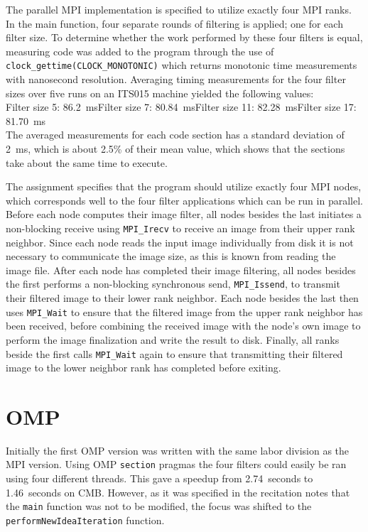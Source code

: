 The parallel MPI implementation is specified to utilize exactly four MPI ranks. In the main function, four separate rounds of filtering is applied; one for each filter size. To determine whether the work performed by these four filters is equal, measuring code was added to the program through the use of \texttt{clock\_gettime(CLOCK\_MONOTONIC)} which returns monotonic time measurements with nanosecond resolution. Averaging timing measurements for the four filter sizes over five runs on an \textsc{ITS015} machine yielded the following values:\\[0.2cm]
Filter size 5: 86.2~ms\quad Filter size 7: 80.84~ms\quad Filter size 11: 82.28~ms\quad Filter size 17: 81.70~ms\\[0.2cm]
The averaged measurements for each code section has a standard deviation of 2~ms, which is about 2.5\% of their mean value, which shows that the sections take about the same time to execute.

The assignment specifies that the program should utilize exactly four \ac{MPI} nodes, which corresponds well to the four filter applications which can be run in parallel. Before each node computes their image filter, all nodes besides the last initiates a non-blocking receive using \texttt{MPI\_Irecv} to receive an image from their upper rank neighbor. Since each node reads the input image individually from disk it is not necessary to communicate the image size, as this is known from reading the image file. After each node has completed their image filtering, all nodes besides the first performs a non-blocking synchronous send, \texttt{MPI\_Issend}, to transmit their filtered image to their lower rank neighbor. Each node besides the last then uses \texttt{MPI\_Wait} to ensure that the filtered image from the upper rank neighbor has been received, before combining the received image with the node's own image to perform the image finalization and write the result to disk. Finally, all ranks beside the first calls \texttt{MPI\_Wait} again to ensure that transmitting their filtered image to the lower neighbor rank has completed before exiting.

\section*{\ac{OMP}}

Initially the first \ac{OMP} version was written with the same labor division as the \ac{MPI} version. Using \ac{OMP} \texttt{section} pragmas the four filters could easily be ran using four different threads. This gave a speedup from 2.74~seconds to 1.46~seconds on \ac{CMB}. However, as it was specified in the recitation notes that the \texttt{main} function was not to be modified, the focus was shifted to the \texttt{performNewIdeaIteration} function.

